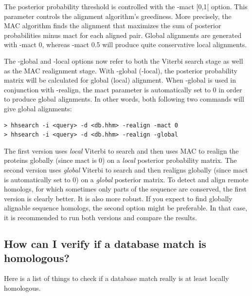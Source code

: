 \documentclass[11pt,a4paper]{article}
\begin{document}
The posterior probability threshold is controlled with the -mact [0,1[ option. 
This parameter controls the alignment algorithm's greediness. More precisely, the 
MAC algorithm finds the alignment that maximizes the sum of posterior probabilities 
minus mact for each aligned pair. Global alignments are generated with -mact 0, 
whereas -mact 0.5 will produce quite conservative local alignments. 

The -global and -local options now refer to both the Viterbi search stage as 
well as the MAC realignment stage. With -global (-local), the posterior probability 
matrix will be calculated for global (local) alignment. When -global is used in 
conjunction with -realign, the mact parameter is automatically set to 0 in order to 
produce global alignments. In other words, both following two commands will give 
global alignments:
\begin{verbatim}
> hhsearch -i <query> -d <db.hhm> -realign -mact 0
> hhsearch -i <query> -d <db.hhm> -realign -global
\end{verbatim}

The first version uses \emph{local} Viterbi to search and then uses MAC to realign the 
proteins globally (since mact is 0) on a \emph{local} posterior probability matrix. The 
second version uses \emph{global} Viterbi to search and then realigns globally (since mact 
is automatically set to 0) on a \emph{global} posterior matrix. To detect and align remote 
homologs, for which sometimes only parts of the sequence are conserved, the first 
version is clearly better. It is also more robust. If you expect to find globally 
alignable sequence homologs, the second option might be preferable. In that case, 
it is recommended to run both versions and compare the results. 

\subsection{How can I verify if a database match is homologous?}

Here is a list of things to check if a database match really is at least locally homologous.
 
\end{document}

